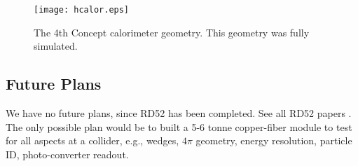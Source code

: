  
\begin{figure}
 \texttt{[image: hcalor.eps]}
 \label{fig:hcalor}
 \caption{The 4th Concept \cite{4th} calorimeter geometry.   This geometry was fully simulated. }
\end{figure}

\subsection{Future Plans}

We have no future plans, since RD52 has been completed.  See all RD52 papers \cite{dream}. The only possible plan would be to built a 5-6 tonne copper-fiber module to test for all aspects at a collider, e.g., wedges, $4 \pi$ geometry, energy resolution, particle ID, photo-converter readout.  

